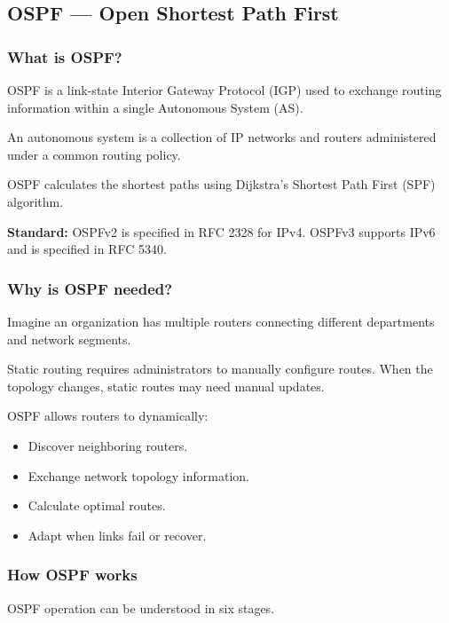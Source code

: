 \subsection{OSPF --- Open Shortest Path First}

\subsubsection{What is OSPF?}

OSPF is a link-state Interior Gateway Protocol (IGP) used to exchange routing information within a single Autonomous System (AS).

An autonomous system is a collection of IP networks and routers administered under a common routing policy.

OSPF calculates the shortest paths using Dijkstra's Shortest Path First (SPF) algorithm.

\textbf{Standard:} OSPFv2 is specified in RFC 2328 for IPv4. OSPFv3 supports IPv6 and is specified in RFC 5340.

\subsubsection{Why is OSPF needed?}

Imagine an organization has multiple routers connecting different departments and network segments.

Static routing requires administrators to manually configure routes. When the topology changes, static routes may need manual updates.

OSPF allows routers to dynamically:

\begin{itemize}
\item Discover neighboring routers.
\item Exchange network topology information.
\item Calculate optimal routes.
\item Adapt when links fail or recover.
\end{itemize}

\subsubsection{How OSPF works}

OSPF operation can be understood in six stages.


